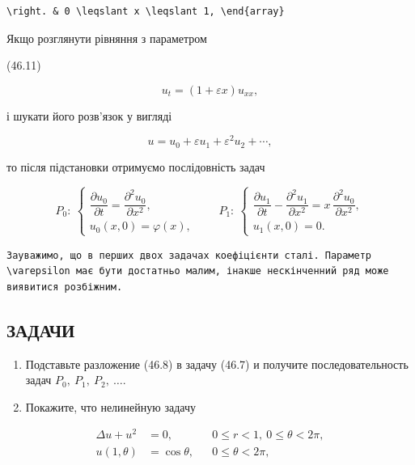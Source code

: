 \documentclass[
  ukrainian,
]{article}
\begin{document}
\begin{verbatim}
\right. & 0 \leqslant x \leqslant 1, \end{array}
\end{verbatim}

Якщо розглянути рівняння з параметром

(46.11)

\[
u_t = (1 + \varepsilon x) u_{xx},
\]

і шукати його розв'язок у вигляді

\[
u = u_0 + \varepsilon u_1 + \varepsilon^2 u_2 + \cdots,
\]

то після підстановки отримуємо послідовність задач

\[
P_0:\ \begin{cases}
\dfrac{\partial u_0}{\partial t} = \dfrac{\partial^2 u_0}{\partial x^2}, \\
u_0(x,0) = \varphi(x),
\end{cases}
\qquad P_1:\ \begin{cases}
\dfrac{\partial u_1}{\partial t} - \dfrac{\partial^2 u_1}{\partial x^2} = x\,\dfrac{\partial^2 u_0}{\partial x^2}, \\
u_1(x,0) = 0.
\end{cases}
\]

\begin{verbatim}
Зауважимо, що в перших двох задачах коефіцієнти сталі. Параметр \varepsilon має бути достатньо малим, інакше нескінченний ряд може виявитися розбіжним.
\end{verbatim}

\subsection{ЗАДАЧИ}\label{ux437ux430ux434ux430ux447ux438}

\begin{enumerate}
\def\labelenumi{\arabic{enumi}.}
\item
  Подставьте разложение (46.8) в задачу (46.7) и получите
  последовательность задач \(P_0,\ P_1,\ P_2,\ \dots\).
\item
  Покажите, что нелинейную задачу
\end{enumerate}

\[
\begin{aligned}
\Delta u + u^2 &= 0, && 0 \leqslant r < 1,\ 0 \leqslant \theta < 2\pi, \\
u(1,\theta) &= \cos\theta, && 0 \leqslant \theta < 2\pi,
\end{aligned}
\]
\end{document}
